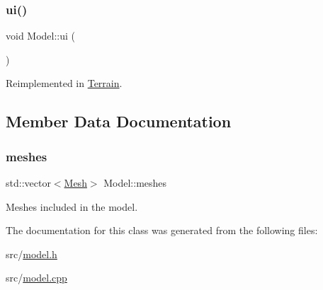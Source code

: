 \subsubsection{\texorpdfstring{ui()}{ui()}}
{\footnotesize\ttfamily void Model\+::ui (\begin{DoxyParamCaption}{ }\end{DoxyParamCaption})\hspace{0.3cm}{\ttfamily [virtual]}}



Reimplemented in \hyperlink{classTerrain_afff1911e27bd05cf1da59799db595322}{Terrain}.



\subsection{Member Data Documentation}
\mbox{\label{classModel_a538e42901dcfba59471072a48a162163}} 
\subsubsection{\texorpdfstring{meshes}{meshes}}
{\footnotesize\ttfamily std\+::vector$<$\hyperlink{classMesh}{Mesh}$>$ Model\+::meshes\hspace{0.3cm}{\ttfamily [protected]}}



Meshes included in the model. 



The documentation for this class was generated from the following files\+:\begin{DoxyCompactItemize}
\item 
src/\hyperlink{model_8h}{model.\+h}\item 
src/\hyperlink{model_8cpp}{model.\+cpp}\end{DoxyCompactItemize}
